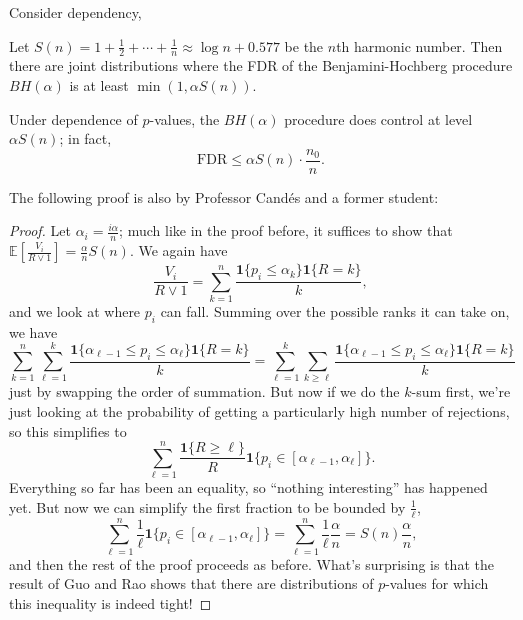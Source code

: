 Consider dependency,
\begin{thm}
Let $S(n) = 1 + \frac{1}{2} + \cdots + \frac{1}{n} \approx \log n + 0.577$ be the $n$th harmonic number. Then there are joint distributions where the FDR of the Benjamini-Hochberg procedure $BH(\alpha)$ is at least $\min(1, \alpha S(n))$.
\end{thm}

\begin{thm}
Under dependence of $p$-values, the $BH(\alpha)$ procedure does control at level $\alpha S(n)$; in fact,
\[
\mathrm{FDR} \leq \alpha S(n) \cdot \frac{n_0}{n}.
\]
\end{thm}

The following proof is also by Professor Cand\'es and a former student:

\begin{proof}
Let $\alpha_i = \frac{i\alpha}{n}$; much like in the proof before, it suffices to show that $\mathbb{E}\left[\frac{V_i}{R \vee 1}\right] = \frac{\alpha}{n} S(n)$. We again have
\[
\frac{V_i}{R \vee 1} = \sum_{k=1}^{n} \frac{\mathbf{1}\{p_i \leq \alpha_k\} \mathbf{1}\{R = k\}}{k},
\]
and we look at where $p_i$ can fall. Summing over the possible ranks it can take on, we have
\[
\sum_{k=1}^{n} \sum_{\ell=1}^{k} \frac{\mathbf{1}\{\alpha_{\ell-1} \leq p_i \leq \alpha_\ell\} \mathbf{1}\{R = k\}}{k} = \sum_{\ell=1}^{k} \sum_{k \geq \ell} \frac{\mathbf{1}\{\alpha_{\ell-1} \leq p_i \leq \alpha_\ell\} \mathbf{1}\{R = k\}}{k}
\]
just by swapping the order of summation. But now if we do the $k$-sum first, we're just looking at the probability of getting a particularly high number of rejections, so this simplifies to
\[
\sum_{\ell=1}^{n} \frac{\mathbf{1}\{R \geq \ell\}}{R} \mathbf{1}\{p_i \in [\alpha_{\ell-1}, \alpha_\ell]\}.
\]
Everything so far has been an equality, so ``nothing interesting'' has happened yet. But now we can simplify the first fraction to be bounded by $\frac{1}{\ell}$,
\[
\sum_{\ell=1}^{n} \frac{1}{\ell} \mathbf{1}\{p_i \in [\alpha_{\ell-1}, \alpha_\ell]\} = \sum_{\ell=1}^{n} \frac{1}{\ell} \frac{\alpha}{n} = S(n) \frac{\alpha}{n},
\]
and then the rest of the proof proceeds as before. What's surprising is that the result of Guo and Rao shows that there are distributions of $p$-values for which this inequality is indeed tight!
\end{proof}

